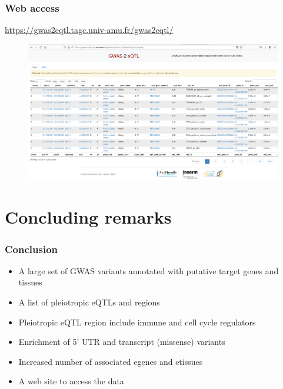 \documentclass{beamer}
\begin{document}
    \begin{frame}
        \frametitle{Web access}

        \url{https://gwas2eqtl.tagc.univ-amu.fr/gwas2eqtl/}


        \begin{figure}[!]
            \includegraphics[width=\textwidth]{fig/web_portal.png}\label{fig:coloc_web}
        \end{figure}

    \end{frame}

    \section{Concluding remarks} %

    \begin{frame}
        \frametitle{Conclusion}

        \begin{itemize}
            \item A large set of GWAS variants annotated with putative target genes and tissues
            \item A list of pleiotropic eQTLs and regions
            \item Pleiotropic eQTL region include immune and cell cycle regulators
            \item Enrichment of 5' UTR and transcript (missense) variants
            \item Increased number of associated egenes and etissues
            \item A web site to access the data
        \end{itemize}

    \end{frame}
\end{document}
